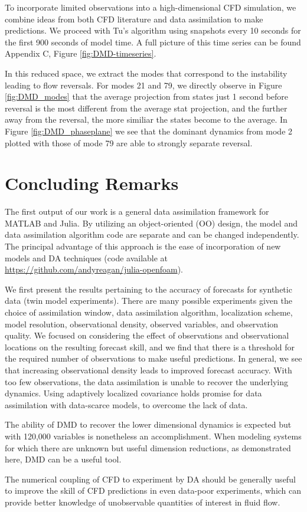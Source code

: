To incorporate limited observations into a high-dimensional CFD simulation, we combine ideas from both CFD literature and data assimilation to make predictions.
We proceed with Tu's algorithm using snapshots every 10 seconds for the first 900 seconds of model time.
A full picture of this time series can be found Appendix C, Figure \ref{fig:DMD-timeseries}.

In this reduced space, we extract the modes that correspond to the instability leading to flow reversals.
For modes 21 and 79, we directly observe in Figure \ref{fig:DMD_modes} that the average projection from states just 1 second before reversal is the most different from the average stat projection, and the further away from the reversal, the more similiar the states become to the average.
In Figure \ref{fig:DMD_phaseplane} we see that the dominant dynamics from mode 2 plotted with those of mode 79 are able to strongly separate reversal.

\section{Concluding Remarks}

The first output of our work is a general data assimilation framework for MATLAB and Julia.
By utilizing an object-oriented (OO) design, the model and data assimilation algorithm code are separate and can be changed independently.
The principal advantage of this approach is the ease of incorporation of new models and DA techniques (code available at \url{https://github.com/andyreagan/julia-openfoam}).

We first present the results pertaining to the accuracy of forecasts for synthetic data (twin model experiments).
There are many possible experiments given the choice of assimilation window, data assimilation algorithm, localization scheme, model resolution, observational density, observed variables, and observation quality.
We focused on considering the effect of observations and observational locations on the resulting forecast skill, and we find that there is a threshold for the required number of observations to make useful predictions.
In general, we see that increasing observational density leads to improved forecast accuracy.
With too few observations, the data assimilation is unable to recover the underlying dynamics.
Using adaptively localized covariance holds promise for data assimilation with data-scarce models, to overcome the lack of data.

The ability of DMD to recover the lower dimensional dynamics is expected but with 120,000 variables is nonetheless an accomplishment.
When modeling systems for which there are unknown but useful dimension reductions, as demonstrated here, DMD can be a useful tool.

The numerical coupling of CFD to experiment by DA should be generally useful to improve the skill of CFD predictions in even data-poor experiments, which can provide better knowledge of unobservable quantities of interest in fluid flow.


